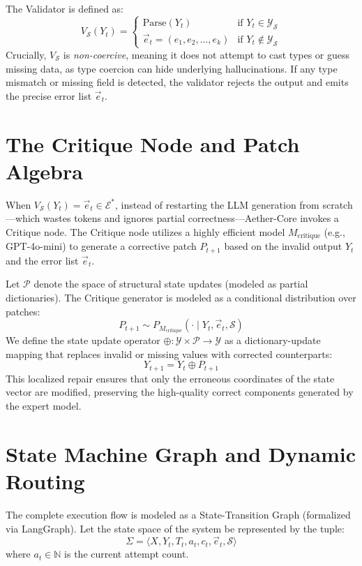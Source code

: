 \documentclass[10pt,journal,compsoc]{IEEEtran}
\begin{document}
The Validator is defined as:
\[ V_{\mathcal{S}}(Y_t) = \begin{cases}
\text{Parse}(Y_t) & \text{if } Y_t \in \mathcal{Y}_{\mathcal{S}} \\
\vec{e}_t = (e_1, e_2, \dots, e_k) & \text{if } Y_t \notin \mathcal{Y}_{\mathcal{S}}
\end{cases} \]
Crucially, $V_{\mathcal{S}}$ is \textit{non-coercive}, meaning it does not attempt to cast types or guess missing data, as type coercion can hide underlying hallucinations. If any type mismatch or missing field is detected, the validator rejects the output and emits the precise error list $\vec{e}_t$.

\section{The Critique Node and Patch Algebra}
When $V_{\mathcal{S}}(Y_t) = \vec{e}_t \in \mathcal{E}^*$, instead of restarting the LLM generation from scratch—which wastes tokens and ignores partial correctness—Aether-Core invokes a Critique node.
The Critique node utilizes a highly efficient model $M_{\text{critique}}$ (e.g., GPT-4o-mini) to generate a corrective patch $P_{t+1}$ based on the invalid output $Y_t$ and the error list $\vec{e}_t$.

Let $\mathcal{P}$ denote the space of structural state updates (modeled as partial dictionaries). The Critique generator is modeled as a conditional distribution over patches:
\[ P_{t+1} \sim P_{M_{\text{critique}}}(\cdot \mid Y_t, \vec{e}_t, \mathcal{S}) \]
We define the state update operator $\oplus : \mathcal{Y} \times \mathcal{P} \to \mathcal{Y}$ as a dictionary-update mapping that replaces invalid or missing values with corrected counterparts:
\[ Y_{t+1} = Y_t \oplus P_{t+1} \]
This localized repair ensures that only the erroneous coordinates of the state vector are modified, preserving the high-quality correct components generated by the expert model.

\section{State Machine Graph and Dynamic Routing}
The complete execution flow is modeled as a State-Transition Graph (formalized via LangGraph).
Let the state space of the system be represented by the tuple:
\[ \Sigma = \langle X, Y_t, T_t, a_t, c_t, \vec{e}_t, \mathcal{S} \rangle \]
where $a_t \in \mathbb{N}$ is the current attempt count.
\end{document}
